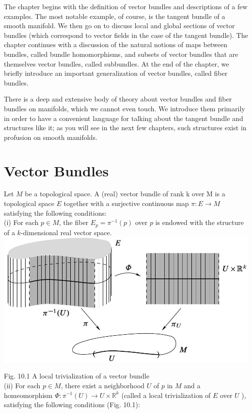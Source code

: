 \documentclass[10pt]{article}
\begin{document}
The chapter begins with the definition of vector bundles and descriptions of a few examples. The most notable example, of course, is the tangent bundle of a smooth manifold. We then go on to discuss local and global sections of vector bundles (which correspond to vector fields in the case of the tangent bundle). The chapter continues with a discussion of the natural notions of maps between bundles, called bundle homomorphisms, and subsets of vector bundles that are themselves vector bundles, called subbundles. At the end of the chapter, we briefly introduce an important generalization of vector bundles, called fiber bundles.

There is a deep and extensive body of theory about vector bundles and fiber bundles on manifolds, which we cannot even touch. We introduce them primarily in order to have a convenient language for talking about the tangent bundle and structures like it; as you will see in the next few chapters, such structures exist in profusion on smooth manifolds.

\section*{Vector Bundles}
Let $M$ be a topological space. A (real) vector bundle of rank k over M is a topological space $E$ together with a surjective continuous map $\pi: E \rightarrow M$ satisfying the following conditions:\\
(i) For each $p \in M$, the fiber $E_{p}=\pi^{-1}(p)$ over $p$ is endowed with the structure of a $k$-dimensional real vector space.\\
\includegraphics[max width=\textwidth, center]{2025_06_03_90f64b1a1e243cccc2e0g-268}

Fig. 10.1 A local trivialization of a vector bundle\\
(ii) For each $p \in M$, there exist a neighborhood $U$ of $p$ in $M$ and a homeomorphism $\Phi: \pi^{-1}(U) \rightarrow U \times \mathbb{R}^{k}$ (called a local trivialization of $E$ over $U$ ), satisfying the following conditions (Fig. 10.1):
\end{document}
